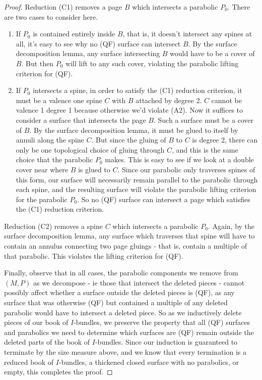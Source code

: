 \begin{proof}
Reduction (C1) removes a page $B$ which intersects a parabolic $P_0$. There are
two cases to consider here.

\begin{enumerate}

\item If $P_0$ is contained entirely inside $B$, that is, it doesn't intersect
any spines at all, it's easy to see why no (QF) surface can intersect $B$. By
the surface decomposition lemma, any surface intersecting $B$ would have to be
a cover of $B$. But then $P_0$ will lift to any such cover, violating the
parabolic lifting criterion for (QF).

\item If $P_0$ intersects a spine, in order to satisfy the (C1) reduction
criterion, it must be a valence one spine $C$ with $B$ attached by degree 2.
$C$ cannot be valence 1 degree 1 because otherwise we'd violate (A2). Now it
suffices to consider a surface that intersects the page $B$. Such a surface
must be a cover of $B$. By the surface decomposition lemma, it must be glued to
itself by annuli along the spine $C$. But since the gluing of $B$ to $C$ is
degree 2, there can only be one topological choice of gluing through $C$, and
this is the same choice that the parabolic $P_0$ makes. This is easy to see if
we look at a double cover near where $B$ is glued to $C$. Since our parabolic
only traverses spines of this form, our surface will necessarily remain
parallel to the parabolic through each spine, and the resulting surface will
violate the parabolic lifting criterion for the parabolic $P_0$. So no (QF)
surface can intersect a page which satisfies the (C1) reduction criterion.

\end{enumerate}

Reduction (C2) removes a spine $C$ which intersects a parabolic $P_0$. Again,
by the surface decomposition lemma, any surface which traverses that spine will
have to contain an annulus connecting two page gluings - that is, contain
a multiple of that parabolic. This violates the lifting criterion for (QF).

Finally, observe that in all cases, the parabolic components we remove from
$(M,P)$ as we decompose - ie those that intersect the deleted pieces - cannot
possibly affect whether a surface outside the deleted pieces is (QF), as any
surface that was otherwise (QF) but contained a multiple of any deleted
parabolic would have to intersect a deleted piece. So as we inductively delete
pieces of our book of $I$-bundles, we preserve the property that all (QF)
surfaces and parabolics we need to determine which surfaces are (QF) remain
outside the deleted parts of the book of $I$-bundles. Since our induction is
guaranteed to terminate by the size measure above, and we know that every
termination is a reduced book of $I$-bundles, a thickened closed surface with
no parabolics, or empty, this completes the proof.

\end{proof}

